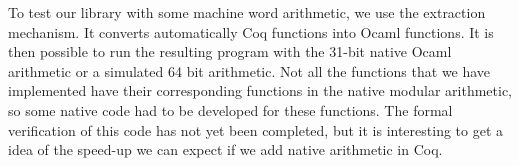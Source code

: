 To test our library with some machine word arithmetic, we use the extraction
mechanism. 
It converts automatically {\sc Coq} functions into {\sc Ocaml} functions.
It is then possible to run the resulting program with the 31-bit native
{\sc Ocaml} arithmetic or a simulated 64 bit arithmetic. 
Not all the functions that we have implemented have their corresponding 
functions in the native modular arithmetic, 
so some native code had to be developed for these functions.
The formal verification of this code has not yet been completed, but
it is interesting to get a idea of the speed-up we can expect if we add 
native arithmetic in Coq.

